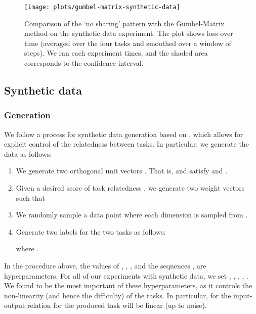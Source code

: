 \documentclass[conference]{IEEEtran}
\begin{document}



\appendix

\begin{figure*}[t]
\begin{center}
\texttt{[image: plots/gumbel-matrix-synthetic-data]}
\end{center}
\caption{Comparison of the `no sharing' pattern with the Gumbel-Matrix method on the synthetic data experiment. The plot shows loss over time (averaged over the four tasks and smoothed over a window of  steps). We ran each experiment  times, and the shaded area corresponds to the  confidence interval.}\label{fig:gumbel_matrix_synthetic_data}
\end{figure*}

\subsection{Synthetic data}

\subsubsection{Generation}\label{appendix:synthetic_data_generation}

We follow a process for synthetic data generation based on \cite{MMoE-KDD-2018}, which allows for explicit control of the relatedness between tasks. In particular, we generate the data as follows:
\begin{enumerate}
\item We generate two orthogonal unit vectors . That is,  and  satisfy  and .
\item Given a desired score of task relatedness , we generate two weight vectors  such that

\item We randomly sample a data point  where each dimension is sampled from .
\item Generate two labels  for the two tasks as follows:


where .
\end{enumerate}

In the procedure above, the values of , , , and the sequences ,  are hyperparameters. For all of our experiments with synthetic data, we set , , , , . We found  to be the most important of these hyperparameters, as it controls the non-linearity (and hence the difficulty) of the tasks. In particular, for  the input-output relation for the produced task will be linear (up to noise).
\end{document}
